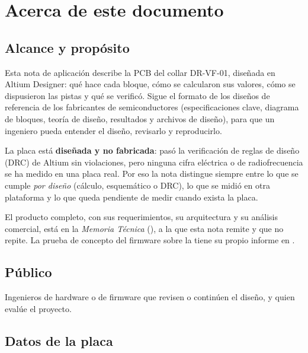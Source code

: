 \section{Acerca de este documento}

\subsection{Alcance y propósito}

Esta nota de aplicación describe la PCB del collar DR-VF-01, diseñada en Altium Designer: qué
hace cada bloque, cómo se calcularon sus valores, cómo se dispusieron las pistas y qué se verificó.
Sigue el formato de los diseños de referencia de los fabricantes de semiconductores (especificaciones
clave, diagrama de bloques, teoría de diseño, resultados y archivos de diseño), para que un ingeniero
pueda entender el diseño, revisarlo y reproducirlo.

La placa está \textbf{diseñada y no fabricada}: pasó la verificación de reglas de diseño (DRC) de
Altium sin violaciones, pero ninguna cifra eléctrica o de radiofrecuencia se ha medido en una placa
real. Por eso la nota distingue siempre entre lo que se cumple \emph{por diseño} (cálculo, esquemático o
DRC), lo que se midió en otra plataforma y lo que queda pendiente de medir cuando exista la placa.

El producto completo, con sus requerimientos, su arquitectura y su análisis comercial, está en la
\emph{Memoria Técnica} (), a la que esta nota remite y
que no repite. La prueba de concepto del firmware sobre la \pBoard{} tiene su propio informe en
.

\subsection{Público}

Ingenieros de hardware o de firmware que revisen o continúen el diseño, y quien evalúe el proyecto.

\subsection{Datos de la placa}

